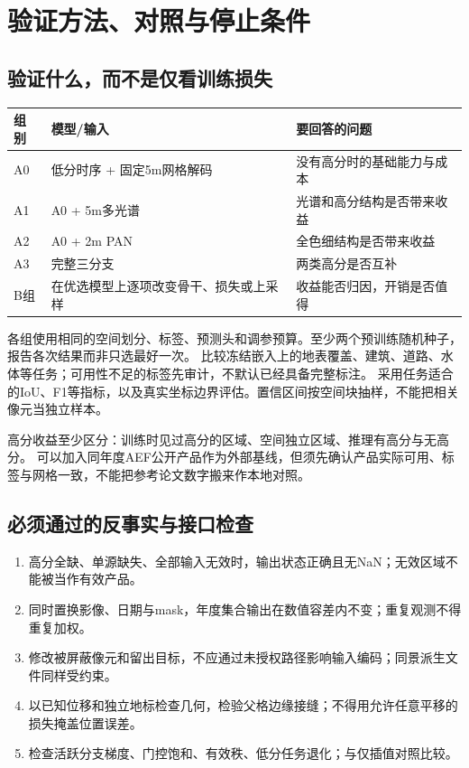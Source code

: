 \documentclass[UTF8,fontset=fandol,zihao=5,a4paper]{ctexart}
\newcommand{\reportpage}{\clearpage}
\begin{document}
\reportpage
\section{验证方法、对照与停止条件}
\subsection{验证什么，而不是仅看训练损失}
\noindent\begin{tabularx}{\linewidth}{@{}p{1.2cm}YY@{}}
\toprule 组别 & 模型/输入 & 要回答的问题\\\midrule
A0 & 低分时序 + 固定5m网格解码 & 没有高分时的基础能力与成本\\
A1 & A0 + 5m多光谱 & 光谱和高分结构是否带来收益\\
A2 & A0 + 2m PAN & 全色细结构是否带来收益\\
A3 & 完整三分支 & 两类高分是否互补\\
B组 & 在优选模型上逐项改变骨干、损失或上采样 & 收益能否归因，开销是否值得\\\bottomrule
\end{tabularx}

各组使用相同的空间划分、标签、预测头和调参预算。至少两个预训练随机种子，报告各次结果而非只选最好一次。
比较冻结嵌入上的地表覆盖、建筑、道路、水体等任务；可用性不足的标签先审计，不默认已经具备完整标注。
采用任务适合的IoU、F1等指标，以及真实坐标边界评估。置信区间按空间块抽样，不能把相关像元当独立样本。

高分收益至少区分：训练时见过高分的区域、空间独立区域、推理有高分与无高分。
可以加入同年度AEF公开产品作为外部基线，但须先确认产品实际可用、标签与网格一致，不能把参考论文数字搬来作本地对照。

\subsection{必须通过的反事实与接口检查}
\begin{enumerate}
\item 高分全缺、单源缺失、全部输入无效时，输出状态正确且无NaN；无效区域不能被当作有效产品。
\item 同时置换影像、日期与mask，年度集合输出在数值容差内不变；重复观测不得重复加权。
\item 修改被屏蔽像元和留出目标，不应通过未授权路径影响输入编码；同景派生文件同样受约束。
\item 以已知位移和独立地标检查几何，检验父格边缘接缝；不得用允许任意平移的损失掩盖位置误差。
\item 检查活跃分支梯度、门控饱和、有效秩、低分任务退化；与仅插值对照比较。
\end{enumerate}
\end{document}
